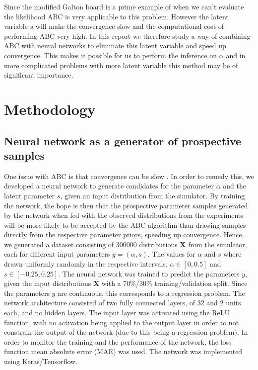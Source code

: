 \documentclass[11pt,a4paper]{article}
\begin{document}
Since the modified Galton board is a prime example of when we can't evaluate the likelihood ABC is very applicable to this problem. However the latent variable $s$ will make the convergence slow and the computational cost of performing ABC very high. In this report we therefore study a way of combining ABC with neural networks to eliminate this latent variable and speed up convergence. This makes it possible for us to perform the inference on $\alpha$ and in more complicated problems with more latent variable this method may be of significant importance. 

\section{Methodology}


\subsection[Task 1]{Neural network as a generator of prospective samples}
\label{sec:method_NN}
One issue with ABC is that convergence can be slow \cite{rasmusbaath}. In order to remedy this, we developed a neural network to generate candidates for the parameter $\alpha$ and the latent parameter $s$, given an input distribution from the simulator. By training the network, the hope is then that the prospective parameter samples generated by the network when fed with the observed distributions from the experiments will be more likely to be accepted by the ABC algorithm than drawing samples directly from the respective parameter priors, speeding up convergence. Hence, we generated a dataset consisting of 300000 distributions $\mathbf{X}$ from the simulator, each for different input parameters $y = (\alpha, s)$. The values for $\alpha$ and $s$ where drawn uniformly randomly in the respective intervals, $\alpha\in[0, 0.5]$ and $s\in[-0.25, 0.25]$. The neural network was trained to predict the parameters $y$, given the input distributions $\mathbf{X}$ with a 70\%/30\% training/validation split. Since the parameters $y$ are continuous, this corresponds to a regression problem. The network architecture consisted of two fully connected layers, of 32 and 2 units each, and no hidden layers. The input layer was activated using the ReLU function, with no activation being applied to the output layer in order to not constrain the output of the network (due to this being a regression problem). In order to monitor the training and the performance of the network, the loss function mean absolute error (MAE) was used. The network was implemented using Keras/Tensorflow.
\end{document}
